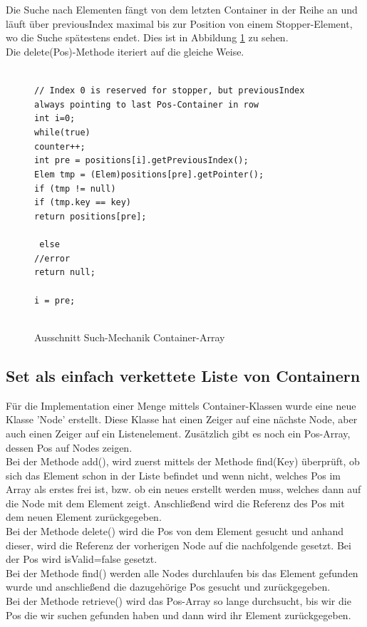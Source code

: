 \documentclass[11pt]{scrartcl}
\begin{document}
Die Suche nach Elementen fängt von dem letzten Container in der Reihe an und läuft über previousIndex maximal bis zur Position von einem Stopper-Element, wo die Suche spätestens endet. Dies ist in Abbildung \ref{figure:findmech} zu sehen.\\
Die delete(Pos)-Methode iteriert auf die gleiche Weise.
\begin{figure}[h!]
\texttt{ \\
// Index 0 is reserved for stopper, but previousIndex always pointing to last Pos-Container in row\\
int i=0;    \\
while(true) {\\
    counter++;\\
    int pre = positions[i].getPreviousIndex();\\
    Elem tmp = (Elem)positions[pre].getPointer();\\
    if (tmp != null) {\\
        if (tmp.key == key) {\\
            return positions[pre];\\
        }\\
    } else {\\
        //error\\
        return null;\\
    }\\
    i = pre;\\
}\\
}
\caption{Ausschnitt Such-Mechanik Container-Array}
\label{figure:findmech}
\end{figure}

\subsection{Set als einfach verkettete Liste von Containern}
\label{sec:setCon}

Für die Implementation einer Menge mittels Container-Klassen wurde eine neue Klasse 'Node' erstellt. Diese Klasse hat einen Zeiger auf eine nächste Node, aber auch einen Zeiger auf ein Listenelement. Zusätzlich gibt es noch ein Pos-Array, dessen Pos auf Nodes zeigen.\\
Bei der Methode add(), wird zuerst mittels der Methode find(Key) überprüft, ob sich das Element schon in der Liste befindet und wenn nicht, welches Pos im Array als erstes frei ist, bzw. ob ein neues erstellt werden muss, welches dann auf die Node mit dem Element zeigt. Anschließend wird die Referenz des Pos mit dem neuen Element zurückgegeben.\\
Bei der Methode delete() wird die Pos von dem Element gesucht und anhand dieser, wird die Referenz der vorherigen Node auf die nachfolgende gesetzt. Bei der Pos wird isValid=false gesetzt.\\
Bei der Methode find() werden alle Nodes durchlaufen bis das Element gefunden wurde und anschließend die dazugehörige Pos gesucht und zurückgegeben.\\
Bei der Methode retrieve() wird das Pos-Array so lange durchsucht, bis wir die Pos die wir suchen gefunden haben und dann wird ihr Element zurückgegeben.\\
\end{document}
